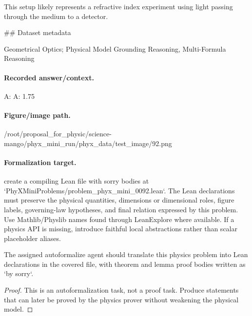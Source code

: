 This setup likely represents a refractive index experiment using light passing through the medium to a detector.

\#\# Dataset metadata

Geometrical Optics; Physical Model Grounding Reasoning, Multi-Formula Reasoning

\paragraph{Recorded answer/context.}
A: A: 1.75

\paragraph{Figure/image path.}
/root/proposal\_for\_physic/science-mango/phyx\_mini\_run/phyx\_data/test\_image/92.png

\paragraph{Formalization target.}
create a compiling Lean file with sorry bodies at `PhyXMiniProblems/problem\_phyx\_mini\_0092.lean`. The Lean declarations must preserve the physical quantities, dimensions or dimensional roles, figure labels, governing-law hypotheses, and final relation expressed by this problem.
Use Mathlib/Physlib names found through LeanExplore where available. If a physics API is missing, introduce faithful local abstractions rather than scalar placeholder aliases.

\begin{theorem}
\label{thm:physics:phyx_mini_0092:target}
The assigned autoformalize agent should translate this physics problem into Lean declarations in the covered file, with theorem and lemma proof bodies written as `by sorry`.
\end{theorem}
\begin{proof}
This is an autoformalization task, not a proof task. Produce statements that can later be proved by the physics prover without weakening the physical model.
\end{proof}

